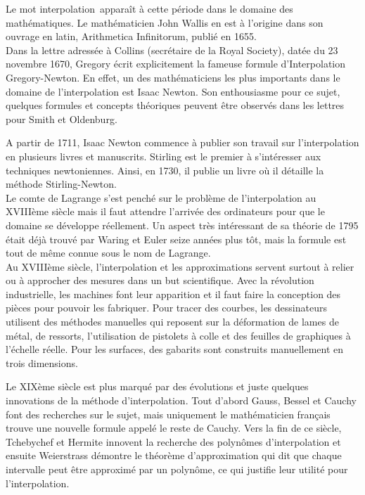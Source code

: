 \documentclass{article}
\begin{document}
\par
	Le mot \guillemotleft interpolation\guillemotright\ appara\^{i}t \`{a} cette p\'{e}riode dans le domaine des math\'{e}matiques. Le math\'{e}maticien John Wallis en est \`{a} l'origine dans son ouvrage en latin, Arithmetica Infinitorum, publi\'{e} en 1655.
\\
\indent
	Dans la lettre adress\'{e}e \`{a} Collins (secr\'{e}taire de la Royal Society), dat\'{e}e du 23 novembre 1670, Gregory \'{e}crit explicitement la fameuse formule d'Interpolation Gregory-Newton. En effet, un des math\'{e}maticiens les plus importants dans le domaine de l'interpolation est Isaac Newton. Son enthousiasme pour ce sujet, quelques formules et concepts th\'{e}oriques peuvent \^{e}tre observ\'{e}s dans les lettres pour Smith et Oldenburg.
\par
	A partir de 1711, Isaac Newton commence \`{a} publier son travail sur l'interpolation en plusieurs livres et manuscrits. Stirling est le premier \`{a} s'int\'{e}resser aux techniques newtoniennes. Ainsi, en 1730, il publie un livre o\`{u} il d\'{e}taille la m\'{e}thode Stirling-Newton.
\\
\indent
	Le comte de Lagrange s'est pench\'{e} sur le probl\`{e}me de l'interpolation au XVIII\`{e}me si\`{e}cle mais il faut attendre l'arriv\'{e}e des ordinateurs pour que le domaine se d\'{e}veloppe r\'{e}ellement. Un aspect tr\`{e}s int\'{e}ressant de sa th\'{e}orie de 1795 \'{e}tait d\'{e}j\`{a} trouv\'{e} par Waring et Euler seize ann\'{e}es plus t\^{o}t, mais la formule est tout de m\^{e}me connue sous le nom de Lagrange.
\\
\indent
	Au XVIII\`{e}me si\`{e}cle, l'interpolation et les approximations servent surtout \`{a} relier ou \`{a} approcher des mesures dans un but scientifique. Avec la r\'{e}volution industrielle, les machines font leur apparition et il faut faire la conception des pi\`{e}ces pour pouvoir les fabriquer. Pour tracer des courbes, les dessinateurs utilisent des m\'{e}thodes manuelles qui reposent sur la d\'{e}formation de lames de m\'{e}tal, de ressorts, l'utilisation de pistolets \`{a} colle et des feuilles de graphiques \`{a} l'\'{e}chelle r\'{e}elle. Pour les surfaces, des gabarits sont construits manuellement en trois dimensions.
\par
	Le XIX\`{e}me si\`{e}cle est plus marqu\'{e} par des \'{e}volutions et juste quelques innovations de la m\'{e}thode d'interpolation. Tout d'abord Gauss, Bessel et Cauchy font des recherches sur le sujet, mais uniquement le math\'{e}maticien fran\c cais trouve une nouvelle formule appel\'{e} le reste de Cauchy. Vers la fin de ce si\`{e}cle, Tchebychef et Hermite innovent la recherche des polyn\^{o}mes d'interpolation et ensuite Weierstrass d\'{e}montre le th\'{e}or\`{e}me d'approximation qui dit que chaque intervalle peut \^{e}tre approxim\'{e} par un polyn\^{o}me, ce qui justifie leur utilit\'{e} pour l'interpolation.
\end{document}
